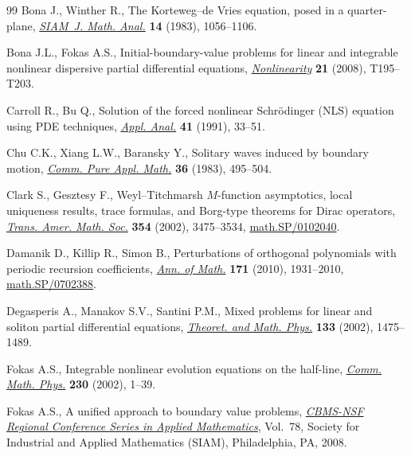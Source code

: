 \documentclass[pdftex]{sigma}
\numberwithin{equation}{section}
\begin{document}
\begin{thebibliography}{99}
Bona J., Winther R., The {K}orteweg--de {V}ries equation, posed in a
 quarter-plane, \href{http://dx.doi.org/10.1137/0514085}{\textit{SIAM~J. Math. Anal.}} \textbf{14} (1983), 1056--1106.

Bona J.L., Fokas A.S., Initial-boundary-value problems for linear and
 integrable nonlinear dispersive partial dif\/ferential equations,
 \href{http://dx.doi.org/10.1088/0951-7715/21/10/T03}{\textit{Nonlinearity}} \textbf{21} (2008), T195--T203.

Carroll R., Bu Q., Solution of the forced nonlinear {S}chr\"odinger ({NLS})
 equation using {PDE} techniques, \href{http://dx.doi.org/10.1080/00036819108840015}{\textit{Appl. Anal.}} \textbf{41} (1991),
 33--51.

Chu C.K., Xiang L.W., Baransky Y., Solitary waves induced by boundary motion,
 \href{http://dx.doi.org/10.1002/cpa.3160360407}{\textit{Comm. Pure Appl. Math.}} \textbf{36} (1983), 495--504.

Clark S., Gesztesy F., Weyl--{T}itchmarsh {$M$}-function asymptotics, local
 uniqueness results, trace formulas, and {B}org-type theorems for {D}irac
 operators, \href{http://dx.doi.org/10.1090/S0002-9947-02-03025-8}{\textit{Trans. Amer. Math. Soc.}} \textbf{354} (2002), 3475--3534,
 \href{http://arxiv.org/abs/math.SP/0102040}{math.SP/0102040}.

Damanik D., Killip R., Simon B., Perturbations of orthogonal polynomials with
 periodic recursion coef\/f\/icients, \href{http://dx.doi.org/10.4007/annals.2010.171.1931}{\textit{Ann. of Math.}} \textbf{171} (2010),
 1931--2010, \href{http://arxiv.org/abs/math.SP/0702388}{math.SP/0702388}.

Degasperis A., Manakov S.V., Santini P.M., Mixed problems for linear and
 soliton partial dif\/ferential equations, \href{http://dx.doi.org/10.1023/A:1021138525261}{\textit{Theoret. and Math. Phys.}}
 \textbf{133} (2002), 1475--1489.

Fokas A.S., Integrable nonlinear evolution equations on the half-line,
 \href{http://dx.doi.org/10.1007/s00220-002-0681-8}{\textit{Comm. Math. Phys.}} \textbf{230} (2002), 1--39.

Fokas A.S., A unif\/ied approach to boundary value problems, \href{http://dx.doi.org/10.1137/1.9780898717068}{\textit{CBMS-NSF
 Regional Conference Series in Applied Mathematics}}, Vol.~78, Society for
 Industrial and Applied Mathematics (SIAM), Philadelphia, PA, 2008.


\end{thebibliography}
\end{document}
